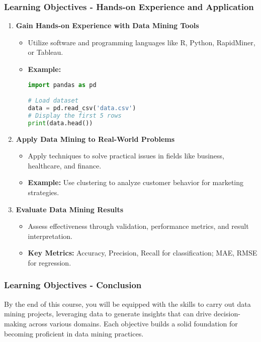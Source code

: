 \documentclass[aspectratio=169]{beamer}
\begin{document}
\begin{frame}[fragile]
    \frametitle{Learning Objectives - Hands-on Experience and Application}
    \begin{enumerate}[resume]
        \item \textbf{Gain Hands-on Experience with Data Mining Tools}
            \begin{itemize}
                \item Utilize software and programming languages like R, Python, RapidMiner, or Tableau.
                \item \textbf{Example:}
                \begin{lstlisting}[language=Python]
import pandas as pd

# Load dataset
data = pd.read_csv('data.csv')
# Display the first 5 rows
print(data.head())
                \end{lstlisting}
            \end{itemize}

        \item \textbf{Apply Data Mining to Real-World Problems}
            \begin{itemize}
                \item Apply techniques to solve practical issues in fields like business, healthcare, and finance.
                \item \textbf{Example:} Use clustering to analyze customer behavior for marketing strategies.
            \end{itemize}

        \item \textbf{Evaluate Data Mining Results}
            \begin{itemize}
                \item Assess effectiveness through validation, performance metrics, and result interpretation.
                \item \textbf{Key Metrics:} Accuracy, Precision, Recall for classification; MAE, RMSE for regression.
            \end{itemize}
    \end{enumerate}
\end{frame}

\begin{frame}[fragile]
    \frametitle{Learning Objectives - Conclusion}
    By the end of this course, you will be equipped with the skills to carry out data mining projects, leveraging data to generate insights that can drive decision-making across various domains. Each objective builds a solid foundation for becoming proficient in data mining practices.
\end{frame}
\end{document}

